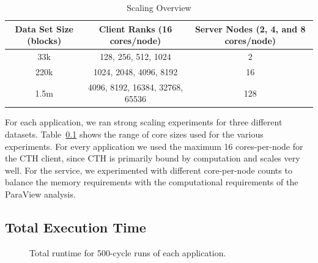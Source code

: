 \begin{table}[htb]

\caption{Scaling Overview}
\label{tab:ScalingOverview}

\centering{}%
\begin{tabular}{|c|c|c|}
\hline 
Data Set Size (blocks) & Client Ranks (16 cores/node) & Server Nodes (2, 4, and 8 cores/node)\tabularnewline
\hline 
\hline 
33k & 128, 256, 512, 1024 & 2\tabularnewline
\hline 
220k & 1024, 2048, 4096, 8192 & 16\tabularnewline
\hline 
1.5m & 4096, 8192, 16384, 32768, 65536 & 128\tabularnewline
\hline 
\end{tabular}
\end{table}


For each application, we ran strong scaling experiments for three different datasets.  
Table~\ref{tab:ScalingOverview} shows the range of core sizes used for the various
experiments.  For every application we used the maximum 16 cores-per-node for the CTH client,
since CTH is primarily bound by computation and scales very well.  For the \intransit service, 
we experimented with different core-per-node counts to balance the memory requirements
with the computational requirements of the ParaView analysis. 



\subsection{Total Execution Time}
\label{tab:ScalingOverview}


\begin{figure}[htb]
\begin{centering}
\vspace{-6pt}

\vspace{-6pt}

\vspace{-6pt}
\caption[]{Total runtime for 500-cycle runs of each application.}
\label{fig:runtime-individual}
\end{centering}
\end{figure}

